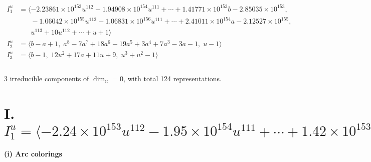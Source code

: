 \documentclass[1p]{elsarticle_modified}
\theoremstyle{definition}
\begin{document}
\begin{align*}
I^u_{1}&=\langle 
-2.23861\times10^{153} u^{112}-1.94908\times10^{154} u^{111}+\cdots+1.41771\times10^{153} b-2.85035\times10^{153},\\
\phantom{I^u_{1}}&\phantom{= \langle  }-1.06042\times10^{155} u^{112}-1.06831\times10^{156} u^{111}+\cdots+2.41011\times10^{154} a-2.12527\times10^{155},\\
\phantom{I^u_{1}}&\phantom{= \langle  }u^{113}+10 u^{112}+\cdots+u+1\rangle \\
I^u_{2}&=\langle 
b- a+1,\;a^8-7 a^7+18 a^6-19 a^5+3 a^4+7 a^3-3 a-1,\;u-1\rangle \\
I^u_{3}&=\langle 
b-1,\;12 u^2+17 a+11 u+9,\;u^3+u^2-1\rangle \\
\\
\end{align*}
\raggedright * 3 irreducible components of $\dim_{\mathbb{C}}=0$, with total 124 representations.\\
\newpage
\renewcommand{\arraystretch}{1}
\centering \section*{I. $I^u_{1}= \langle -2.24\times10^{153} u^{112}-1.95\times10^{154} u^{111}+\cdots+1.42\times10^{153} b-2.85\times10^{153},\;-1.06\times10^{155} u^{112}-1.07\times10^{156} u^{111}+\cdots+2.41\times10^{154} a-2.13\times10^{155},\;u^{113}+10 u^{112}+\cdots+u+1 \rangle$}
\flushleft \textbf{(i) Arc colorings}\\
\end{document}
